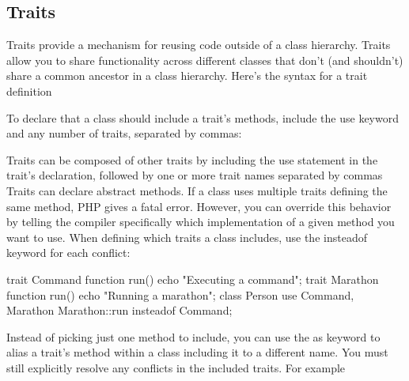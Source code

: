 \documentclass{report}
\begin{document}
\subsection{Traits}
\bigbreak \noindent 
Traits provide a mechanism for reusing code outside of a class hierarchy. Traits allow you to share functionality across different classes that don’t (and shouldn’t) share a common ancestor in a class hierarchy. Here’s the syntax for a trait definition
\bigbreak \noindent 
{}
\bigbreak \noindent 
To declare that a class should include a trait’s methods, include the use keyword and
any number of traits, separated by commas:
\bigbreak \noindent 
{}
\bigbreak \noindent 
Traits can be composed of other traits by including the use statement in the trait’s declaration, followed by one or more trait names separated by commas
\bigbreak \noindent 
Traits can declare abstract methods.
\bigbreak \noindent 
If a class uses multiple traits defining the same method, PHP gives a fatal error. However, you can override this behavior by telling the compiler specifically which implementation of a given method you want to use. When defining which traits a class includes, use the insteadof keyword for each conflict:
\bigbreak \noindent 
\begin{phpcode}
    trait Command
    {
        function run()
        {
            echo "Executing a command\n";
        }
    }
    trait Marathon
    {
        function run()
        {
            echo "Running a marathon\n";
        }
    }
    class Person
    {
        use Command, Marathon {
            Marathon::run insteadof Command;
        }
    }
\end{phpcode}
\bigbreak \noindent 
Instead of picking just one method to include, you can use the as keyword to alias a trait’s method within a class including it to a different name. You must still explicitly resolve any conflicts in the included traits. For example
\bigbreak \noindent 
{}
\end{document}
